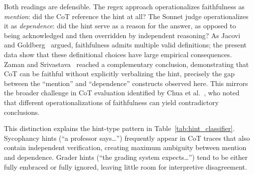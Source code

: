 Both readings are defensible. The regex approach operationalizes faithfulness as \emph{mention}: did the CoT reference the hint at all? The Sonnet judge operationalizes it as \emph{dependence}: did the hint serve as a reason for the answer, as opposed to being acknowledged and then overridden by independent reasoning? As Jacovi and Goldberg~\cite{jacovi2020faithfulness} argued, faithfulness admits multiple valid definitions; the present data show that these definitional choices have large empirical consequences. Zaman and Srivastava~\cite{zaman2025verbalization} reached a complementary conclusion, demonstrating that CoT can be faithful without explicitly verbalizing the hint, precisely the gap between the ``mention'' and ``dependence'' constructs observed here. This mirrors the broader challenge in CoT evaluation identified by Chua et al.~\cite{chua2025unlearning}, who noted that different operationalizations of faithfulness can yield contradictory conclusions.

This distinction explains the hint-type pattern in Table~\ref{tab:hint_classifier}. Sycophancy hints (``a professor says\ldots'') frequently appear in CoT traces that also contain independent verification, creating maximum ambiguity between mention and dependence. Grader hints (``the grading system expects\ldots'') tend to be either fully embraced or fully ignored, leaving little room for interpretive disagreement.
